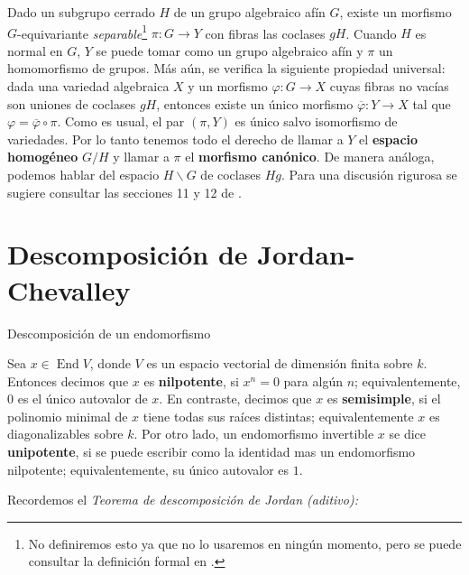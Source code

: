 \documentclass[spanish,12pt]{amsart}
\makeatletter
\renewcommand\subsection{\@startsection{subsection}{2}%
  \z@{.5\linespacing\@plus.7\linespacing}{-.5em}%
  {\normalfont\sffamily}}
\theoremstyle{definition}
\theoremstyle{remark}
\numberwithin{equation}{section}
\renewcommand{\bar}[1]{\overline{#1}}
\makeatother
\begin{document}
Dado un subgrupo cerrado $H$ de un grupo algebraico afín $G$, existe un morfismo $G$-equivariante \textit{separable}\footnote{No definiremos esto ya que no lo usaremos en ningún momento, pero se puede consultar la definición formal en \cite{humphreys2012linearAlgebraicGroups}.} $\pi : G \to Y$ con fibras las coclases $g H$. Cuando $H$ es normal en $G$, $Y$ se puede tomar como un grupo algebraico afín y $\pi$ un homomorfismo de grupos. Más aún, se verifica la siguiente propiedad universal: dada una variedad algebraica $X$ y un morfismo $\varphi : G \to X$ cuyas fibras no vacías son uniones de coclases $gH$, entonces existe un único morfismo $\bar \varphi : Y \to X$ tal que $\varphi = \bar \varphi \circ \pi$. Como es usual, el par $(\pi, Y)$ es único salvo isomorfismo de variedades. Por lo tanto tenemos todo el derecho de llamar a $Y$ el \textbf{espacio homogéneo} $G/H$ y llamar a $\pi$ el \textbf{morfismo canónico}. De manera análoga, podemos hablar del espacio $H\backslash G$ de coclases $Hg$. Para una discusión rigurosa se sugiere consultar las secciones 11 y 12 de \cite{humphreys2012linearAlgebraicGroups}.





\section{Descomposición de Jordan-Chevalley}

\subsection{Descomposición de un endomorfismo}

Sea $x \in \operatorname{End} V$, donde $V$ es un espacio vectorial de dimensión finita sobre $k$. Entonces decimos que $x$ es \textbf{nilpotente}, si $x^n = 0$ para algún $n$; equivalentemente, $0$ es el único autovalor de $x$. En contraste, decimos que $x$ es \textbf{semisimple}, si el polinomio minimal de $x$ tiene todas sus raíces distintas; equivalentemente $x$ es diagonalizables sobre $k$. Por otro lado, un endomorfismo invertible $x$ se dice \textbf{unipotente}, si se puede escribir como la identidad mas un endomorfismo nilpotente; equivalentemente, su único autovalor es $1$.

Recordemos el \textit{Teorema de descomposición de Jordan (aditivo):}
\end{document}

